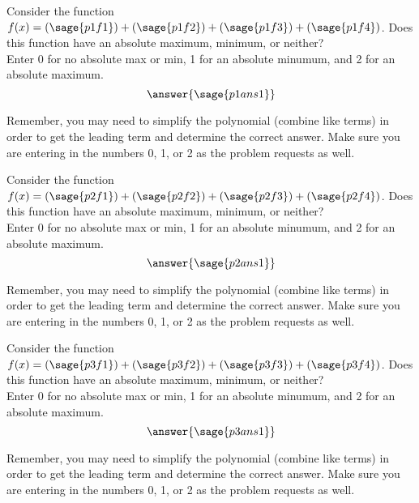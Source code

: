\documentclass{ximera}
\begin{document}
\begin{problem}
    Consider the function $f(x) = (\sage{p1f1}) + (\sage{p1f2}) + (\sage{p1f3}) + (\sage{p1f4})$. Does this function have an absolute maximum, minimum, or neither? \\
    Enter 0 for no absolute max or min, 1 for an absolute minumum, and 2 for an absolute maximum. 
    \[
        \answer{\sage{p1ans1}}
    \]
    \begin{feedback}
        Remember, you may need to simplify the polynomial (combine like terms) in order to get the leading term and determine the correct answer. Make sure you are entering in the numbers 0, 1, or 2 as the problem requests as well.
    \end{feedback}
\end{problem}


\begin{problem}
    Consider the function $f(x) = (\sage{p2f1}) + (\sage{p2f2}) + (\sage{p2f3}) + (\sage{p2f4})$. Does this function have an absolute maximum, minimum, or neither? \\
    Enter 0 for no absolute max or min, 1 for an absolute minumum, and 2 for an absolute maximum. 
    \[
        \answer{\sage{p2ans1}}
    \]
    \begin{feedback}
        Remember, you may need to simplify the polynomial (combine like terms) in order to get the leading term and determine the correct answer. Make sure you are entering in the numbers 0, 1, or 2 as the problem requests as well.
    \end{feedback}
\end{problem}


\begin{problem}
    Consider the function $f(x) = (\sage{p3f1}) + (\sage{p3f2}) + (\sage{p3f3}) + (\sage{p3f4})$. Does this function have an absolute maximum, minimum, or neither? \\
    Enter 0 for no absolute max or min, 1 for an absolute minumum, and 2 for an absolute maximum. 
    \[
        \answer{\sage{p3ans1}}
    \]
    \begin{feedback}
        Remember, you may need to simplify the polynomial (combine like terms) in order to get the leading term and determine the correct answer. Make sure you are entering in the numbers 0, 1, or 2 as the problem requests as well.
    \end{feedback}
\end{problem}
\end{document}
